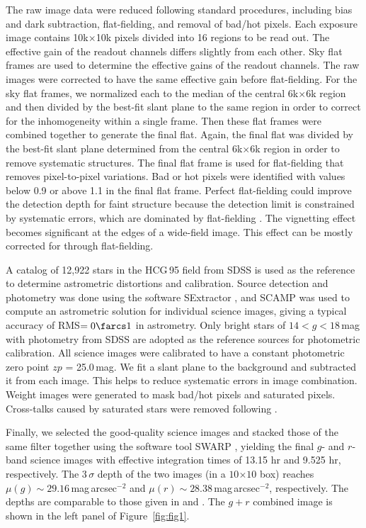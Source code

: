 \documentclass[twocolumn,trackchanges]{aastex61}
\begin{document}
The raw image data were reduced following standard procedures, including bias and dark subtraction, flat-fielding, and removal of bad/hot pixels. Each exposure image contains 10k$\times$10k pixels divided into 16 regions to be read out. The effective gain of the readout channels differs slightly from each other. Sky flat frames are used to determine the effective gains of the readout channels. The raw images were corrected to have the same effective gain before flat-fielding. For the sky flat frames, we normalized each to the median of the central 6k$\times$6k region and then divided by the best-fit slant plane to the same region in order to correct for the inhomogeneity within a single frame. Then these flat frames were combined together to generate the final flat. Again, the final flat was divided by the best-fit slant plane determined from the central  6k$\times$6k region in order to remove systematic structures.  The final flat frame is used for flat-fielding that removes pixel-to-pixel variations. Bad or hot pixels were identified with values below 0.9 or above 1.1 in the final flat frame. Perfect flat-fielding could improve the detection depth for faint structure because the detection limit is constrained by systematic errors, which are dominated by flat-fielding \citep{Abraham2014}.         
The vignetting effect becomes significant at the edges of a wide-field image. This effect can be mostly corrected for through flat-fielding. 


A catalog of 12,922 stars in the HCG\,95 field from SDSS is used as the reference to determine astrometric distortions and calibration.   Source detection and photometry was done using the software SExtractor \citep{BertinArnouts1996}, and SCAMP \citep{Bertin2006} was used to compute an astrometric solution for individual science images, giving a typical accuracy of RMS$=0\farcs 1$ in astrometry. Only bright stars of $14 < g < 18$\,mag with photometry from SDSS are adopted as the reference sources for photometric calibration.  All science images were calibrated  to have a constant photometric zero point $zp$ = 25.0\,mag.  We fit a slant plane to the background and subtracted it from each image. This helps to reduce systematic errors in image combination.  Weight images were generated to mask bad/hot pixels and saturated pixels.  Cross-talks caused by saturated stars were removed following \cite{Freyhammer2001}.


Finally, we selected the good-quality science images and stacked those of the same filter together using the software tool SWARP \citep{Bertin2002}, yielding the final $g$- and $r$-band science images with effective integration times of 13.15 hr and 9.525 hr, respectively. The $3\,\sigma$ depth of the two images (in a $ 10$\arcsec$ \times 10$\arcsec$ $ box) reaches $\mu(g) \sim 29.16$\,mag\,arcsec$^{-2}$ and $\mu(r) \sim 28.38$\,mag\,arcsec$^{-2}$, respectively. The depths are comparable to those given in \cite{FliriTrujillo2016} and \cite{Koda2015}. The $g + r$ combined image is shown in the left panel of Figure~\ref{fig:fig1}.
\end{document}
